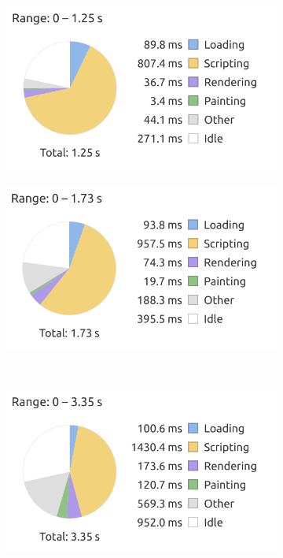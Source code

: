 \documentclass[a4paper]{article}
\begin{document}
\begin{figure}[h!]
    \centering
    \begin{subfigure}{0.49\textwidth}
        \includegraphics[width=\textwidth]{figure/clientsidePerformance/graph1.png}
    \end{subfigure}
    \begin{subfigure}{0.49\textwidth}
        \includegraphics[width=\textwidth]{figure/clientsidePerformance/graph30games1.png}
    \end{subfigure}
    \\
    \begin{subfigure}{0.5\textwidth}
        \includegraphics[width=\textwidth]{figure/clientsidePerformance/graph90games1.png}
    \end{subfigure}
    

\end{figure}
\end{document}
